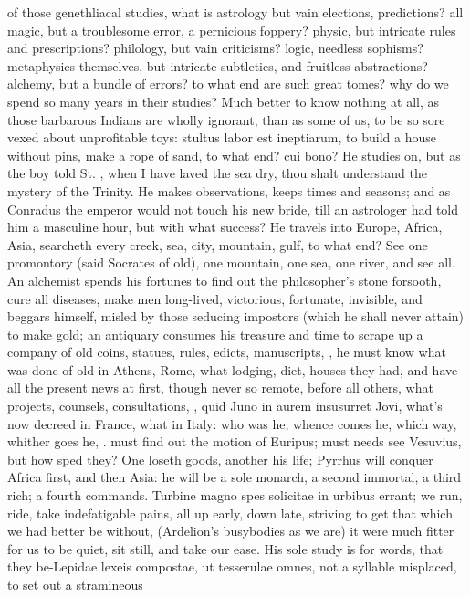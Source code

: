 {of those genethliacal studies, what is astrology but vain elections,
predictions? all magic, but a troublesome error, a pernicious foppery?
physic, but intricate rules and prescriptions? philology, but vain
criticisms? logic, needless sophisms? metaphysics themselves, but
intricate subtleties, and fruitless abstractions? alchemy, but a bundle
of errors? to what end are such great tomes? why do we spend so many
years in their studies? Much better to know nothing at all, as those
barbarous Indians are wholly ignorant, than as some of us, to be so
sore vexed about unprofitable toys: stultus labor est ineptiarum, to
build a house without pins, make a rope of sand, to what end? cui bono?
He studies on, but as the boy told St. \Austin{}, when I have laved the
sea dry, thou shalt understand the mystery of the Trinity. He makes
observations, keeps times and seasons; and as Conradus the
emperor would not touch his new bride, till an astrologer had told him
a masculine hour, but with what success? He travels into Europe,
Africa, Asia, searcheth every creek, sea, city, mountain, gulf, to what
end? See one promontory (said Socrates of old), one mountain, one sea,
one river, and see all. An alchemist spends his fortunes to find out
the philosopher's stone forsooth, cure all diseases, make men
long-lived, victorious, fortunate, invisible, and beggars himself,
misled by those seducing impostors (which he shall never attain) to
make gold; an antiquary consumes his treasure and time to scrape up a
company of old coins, statues, rules, edicts, manuscripts, \etc{}, he must
know what was done of old in Athens, Rome, what lodging, diet, houses
they had, and have all the present news at first, though never so
remote, before all others, what projects, counsels, consultations, \etc{},
quid Juno in aurem insusurret Jovi, what's now decreed in France, what
in Italy: who was he, whence comes he, which way, whither goes he, \etc{}.
\Aristotle must find out the motion of Euripus; \Pliny{} must needs see
Vesuvius, but how sped they? One loseth goods, another his life;
Pyrrhus will conquer Africa first, and then Asia: he will be a sole
monarch, a second immortal, a third rich; a fourth commands. 
Turbine magno spes solicitae in urbibus errant; we run, ride, take
indefatigable pains, all up early, down late, striving to get that
which we had better be without, (Ardelion's busybodies as we are) it
were much fitter for us to be quiet, sit still, and take our ease. His
sole study is for words, that they be-Lepidae lexeis compostae, ut
tesserulae omnes, not a syllable misplaced, to set out a stramineous
}
